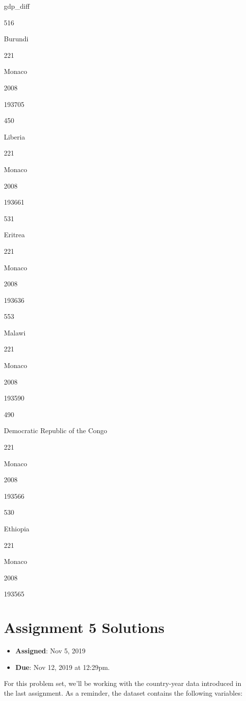 \documentclass[]{book}
\providecommand{\tightlist}{%
  \setlength{\itemsep}{0pt}\setlength{\parskip}{0pt}}
\begin{document}
gdp\_diff

516

Burundi

221

Monaco

2008

193705

450

Liberia

221

Monaco

2008

193661

531

Eritrea

221

Monaco

2008

193636

553

Malawi

221

Monaco

2008

193590

490

Democratic Republic of the Congo

221

Monaco

2008

193566

530

Ethiopia

221

Monaco

2008

193565

\hypertarget{assignment-5-solutions}{%
\section{Assignment 5 Solutions}\label{assignment-5-solutions}}

\begin{itemize}
\tightlist
\item
  \textbf{Assigned}: Nov 5, 2019
\item
  \textbf{Due}: Nov 12, 2019 at 12:29pm.
\end{itemize}

For this problem set, we'll be working with the country-year data introduced in the last assignment. As a reminder, the dataset contains the following variables:
\end{document}
